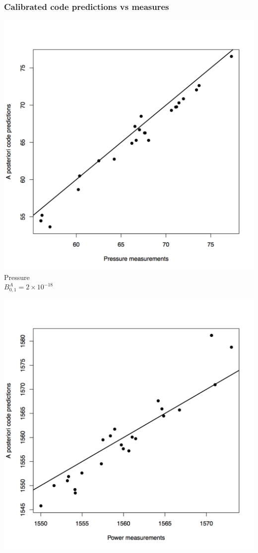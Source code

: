 \documentclass[nopagenumber,9pt]{beamer}
\begin{document}
\begin{frame}
 \frametitle{Calibrated code predictions vs measures}
\begin{minipage}{.5\textwidth}
\includegraphics[width=\textwidth]{code_post_vs_measure_P.png}\\
\centering Pressure \\
$B_{0,1}^A=2\times10^{-18}$ 
\end{minipage}\hfill
\begin{minipage}{.5\textwidth}
\includegraphics[width=\textwidth]{code_post_vs_measure_W.png}\\

\end{minipage}
\end{frame}
\end{document}
